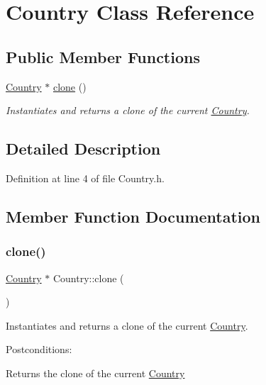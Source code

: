 \hypertarget{classCountry}{}\section{Country Class Reference}
\label{classCountry}
\subsection*{Public Member Functions}
\begin{DoxyCompactItemize}
\item 
\hyperlink{classCountry}{Country} $\ast$ \hyperlink{classCountry_a82562b18230bbeceb22b13c0ab046a1c}{clone} ()
\begin{DoxyCompactList}\small\item\em Instantiates and returns a clone of the current \hyperlink{classCountry}{Country}. \end{DoxyCompactList}\end{DoxyCompactItemize}


\subsection{Detailed Description}


Definition at line 4 of file Country.\+h.



\subsection{Member Function Documentation}
\mbox{\label{classCountry_a82562b18230bbeceb22b13c0ab046a1c}} 
\subsubsection{\texorpdfstring{clone()}{clone()}}
{\footnotesize\ttfamily \hyperlink{classCountry}{Country} $\ast$ Country\+::clone (\begin{DoxyParamCaption}{ }\end{DoxyParamCaption})}



Instantiates and returns a clone of the current \hyperlink{classCountry}{Country}. 

Postconditions\+:
\begin{DoxyItemize}
\item Returns the clone of the current \hyperlink{classCountry}{Country}
\end{DoxyItemize}

